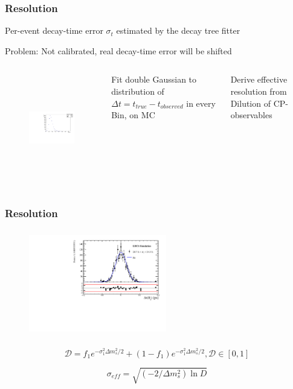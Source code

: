 \documentclass[]{beamer}
\begin{document}
\begin{frame}
\frametitle{Resolution}

Per-event decay-time error $\sigma_{t}$ estimated by the decay tree fitter \newline

Problem: Not calibrated, real decay-time error will be shifted


\begin{columns}


 \begin{figure}[h]
\includegraphics[width=5.5cm,height=4.7cm]{plots/Bs_cterr_MC.pdf}
\end{figure}


Fit double Gaussian to distribution of $\Delta t = t_{true} - t_{observed}$ in every Bin, on MC \newline

Derive effective resolution from Dilution of CP-observables 

\end{columns}

\end{frame}

\begin{frame}
\frametitle{Resolution}


\begin{figure}
\includegraphics[width=6.0cm,height=4.7cm]{plots/SignalMC_bin_2.pdf}
\end{figure}

\[\mathcal{D} = f_{1}e^{-\sigma_{1}^{2}\Delta m_{s}^{2}/2} + (1-f_{1})e^{-\sigma_{1}^{2}\Delta m_{s}^{2}/2}, \mathcal{D}\in [0,1]\] 

\[\sigma_{eff} = \sqrt{(-2/\Delta m_{s}^{2}) \ln{D}}\]

\end{frame}
\end{document}

